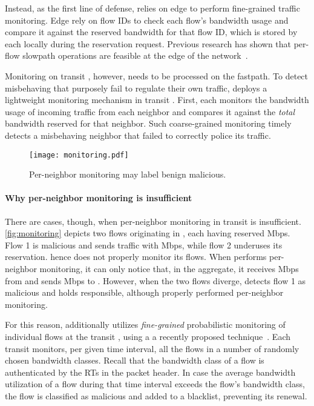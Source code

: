 Instead, as the first line of defense, \name relies on edge \ADs to perform fine-grained traffic
monitoring.  Edge \ADs rely on flow IDs to check each flow's bandwidth usage
and compare it against the reserved bandwidth for that flow ID, which is stored
by each \AD locally during the reservation request.  Previous research has
shown that per-flow slowpath operations are feasible at the edge of the
network~\cite{Stoica2003}.

Monitoring on transit \ADs, however, needs to be processed on the fastpath.  To
detect misbehaving \ADs that purposely fail to regulate their own traffic,
\name deploys a lightweight monitoring mechanism in transit \ADs. First, each
\AD monitors the bandwidth usage of incoming traffic from each neighbor \AD and
compares it against the \emph{total} bandwidth reserved for that neighbor. Such
coarse-grained monitoring timely detects a misbehaving neighbor that
failed to correctly police its traffic.

\begin{figure}[t]
  \begin{center}
    \texttt{[image: monitoring.pdf]}
  \end{center}
  \vspace{-3mm}
  \caption{Per-neighbor monitoring may label benign  malicious.}
  \vspace{-7mm}
  \label{fig:monitoring}
\end{figure}

\paragraph{Why per-neighbor monitoring is insufficient} There are cases,
though, when per-neighbor monitoring in transit \ADs is insufficient.
\autoref{fig:monitoring} depicts two flows originating in , each having
reserved  Mbps. Flow 1 is malicious and sends traffic with  Mbps, while
flow 2 underuses its reservation.  hence does not properly monitor its
flows.  When  performs per-neighbor monitoring, it can only notice that,
in the aggregate, it receives  Mbps from  and sends  Mbps to .
However, when the two flows diverge,  detects flow 1 as malicious and
holds  responsible, although  properly performed per-neighbor
monitoring. 

For this reason, \name additionally utilizes \textit{fine-grained} probabilistic
monitoring of individual flows at the transit \ADs, using a a recently proposed
technique~\cite{hao}. Each transit \AD monitors, per given time interval, all
the flows in a number of randomly chosen bandwidth classes.  Recall that the
bandwidth class of a flow is authenticated by the RTs in the packet header.  In
case the average bandwidth utilization of a flow during that time interval
exceeds the flow's bandwidth class, the flow is classified as malicious and
added to a blacklist, preventing its renewal.
  


